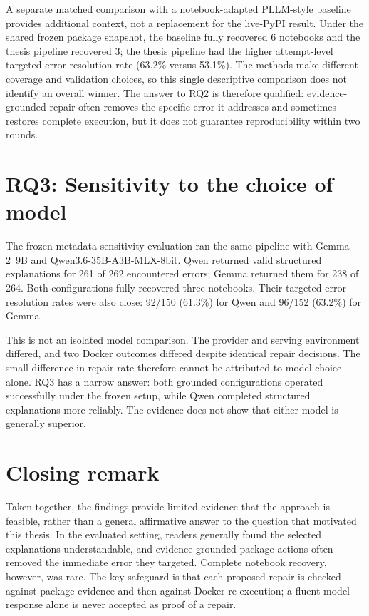 A separate matched comparison with a notebook-adapted PLLM-style baseline
provides additional context, not a replacement for the live-PyPI result. Under
the shared frozen package snapshot, the baseline fully recovered 6 notebooks
and the thesis pipeline recovered 3; the thesis pipeline had the higher
attempt-level targeted-error resolution rate (63.2\% versus 53.1\%). The
methods make different coverage and validation choices, so this single
descriptive comparison does not identify an overall winner. The answer to RQ2
is therefore qualified: evidence-grounded repair often removes the specific
error it addresses and sometimes restores complete execution, but it does not
guarantee reproducibility within two rounds.

\section*{RQ3: Sensitivity to the choice of model}

The frozen-metadata sensitivity evaluation ran the same pipeline with
Gemma-2~9B and Qwen3.6-35B-A3B-MLX-8bit. Qwen returned valid structured
explanations for 261 of 262 encountered errors; Gemma returned them for 238 of
264. Both configurations fully recovered three notebooks. Their targeted-error
resolution rates were also close: 92/150 (61.3\%) for Qwen and 96/152 (63.2\%)
for Gemma.

This is not an isolated model comparison. The provider and serving environment
differed, and two Docker outcomes differed despite identical repair decisions.
The small difference in repair rate therefore cannot be attributed to model
choice alone. RQ3 has a narrow answer: both grounded configurations operated
successfully under the frozen setup, while Qwen completed structured
explanations more reliably. The evidence does not show that either model is
generally superior.

\section*{Closing remark}

Taken together, the findings provide limited evidence that the approach is
feasible, rather than a general affirmative answer to the question that
motivated this thesis. In the evaluated setting, readers generally found the
selected explanations understandable, and evidence-grounded package actions
often removed the immediate error they targeted. Complete notebook recovery,
however, was rare. The key safeguard is that each proposed repair is checked
against package evidence and then against Docker re-execution; a fluent model
response alone is never accepted as proof of a repair.

